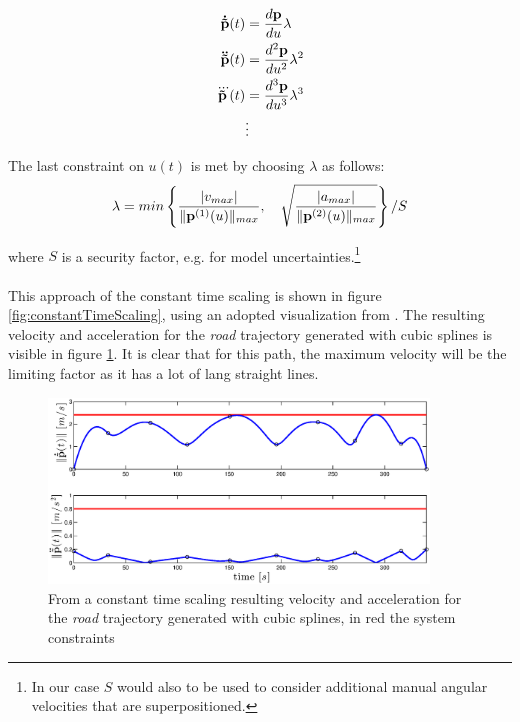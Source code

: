 \begin{align}
{\bf \dot{\tilde{p}}}(t) &= \frac{d {\bf p}}{du}\lambda \\
{\bf \ddot{\tilde{p}}}(t) &= \frac{d^{2} {\bf p}}{du^{2}}\lambda^2 \\
{\bf \dddot{\tilde{p}}}(t) &= \frac{d^{3} {\bf p}}{du^{3}}\lambda^3 \\
&\vdots			\nonumber
\end{align}

The last constraint on $u(t)$ is met by choosing $\lambda$ as follows:
\begin{equation}
\lambda = min \left\{ \frac{|v_{max}|}{\|{\bf p}^{(1)}(u)\|_{max}}, \quad \sqrt{\frac{|a_{max}|}{\|{\bf p}^{(2)}(u)\|_{max}}}  \right\}/S
\end{equation}

where $S$ is a security factor, e.g. for model uncertainties.\footnote{In our case $S$ would also to be used to consider additional manual angular velocities that are superpositioned.}  \\
\\
This approach of the constant time scaling is shown in figure \ref{fig:constantTimeScaling}, using an adopted visualization from \cite{doessegger}. The resulting velocity and acceleration for the \textit{road} trajectory generated with cubic splines is visible in figure \ref{fig:constantTimeScaling3cp_road}. It is clear that for this path, the maximum velocity will be the limiting factor as it has a lot of lang straight lines.

\begin{figure}[H]
	\centering
    \includegraphics[width = 0.9\textwidth]{graphics/constantTimeScaling3cp_road.eps}
  \caption{From a constant time scaling resulting velocity and acceleration for the \textit{road} trajectory generated with cubic splines, in red the system constraints}
  \label{fig:constantTimeScaling3cp_road}
\end{figure}



